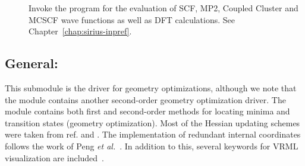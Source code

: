 \begin{description}
\item[]
Invoke the {\sir} program for the evaluation of SCF, MP2, Coupled
Cluster and MCSCF wave functions as well as DFT calculations. See
Chapter~\ref{chap:sirius-inpref}. 
\end{description}

%

\subsection{General: }\label{subsec:minimize}

This submodule is the driver for geometry optimizations, although we
note that the  module contains another second-order
geometry optimization driver. The
 module contains both first and second-order methods
for locating minima and transition states
(geometry optimization). Most of the Hessian
updating schemes were taken from
ref.\cite{thkrprt95} and \cite{Fletcher}. The implementation of
redundant internal coordinates
follows the work of Peng {\it et al.\/}~\cite{cppyahbsmjfjcc17}. In
addition to this, several keywords for VRML visualization are
included~\cite{VRML}.

